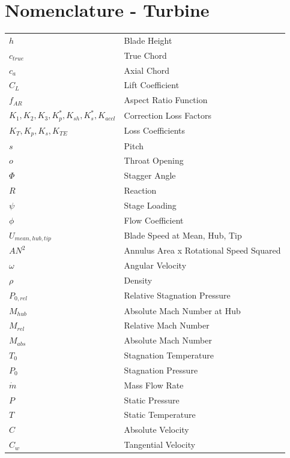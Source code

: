 \documentclass[12pt, letter]{report}
\begin{document}
\vspace{20pt}

\section*{Nomenclature - Turbine}

\begin{longtable*}{@{}l @{\quad  -  \quad} l@{}}

$h$ & Blade Height \\
$c_{true}$ & True Chord \\
$c_a$ & Axial Chord \\
$C_L$ & Lift Coefficient \\
$f_{AR}$ & Aspect Ratio Function \\
$K_1, K_2, K_3, K^*_p, K_{sh}, K^*_s, K_{accl}$ & Correction Loss Factors \\
$K_T, K_p, K_s, K_{TE}$ & Loss Coefficients \\
$s$ & Pitch \\
$o$ & Throat Opening \\
$\Phi$ & Stagger Angle \\
$R$ & Reaction \\
$\psi$ & Stage Loading \\
$\phi$ & Flow Coefficient \\
$U_{mean, hub, tip}$ & Blade Speed at Mean, Hub, Tip \\
$AN^2$ & Annulus Area x Rotational Speed Squared \\
$\omega$ & Angular Velocity \\
$\rho$ & Density  \\
$P_{0, rel}$ & Relative Stagnation Pressure \\
$M_{hub}$ & Absolute Mach Number at Hub  \\
$M_{rel}$ & Relative Mach Number \\
$M_{abs}$ & Absolute Mach Number \\
$T_0$ & Stagnation Temperature  \\
$P_0$ & Stagnation Pressure  \\
$\dot{m}$ & Mass Flow Rate  \\
$P$ & Static Pressure   \\
$T$ & Static Temperature  \\
$C$ & Absolute Velocity \\
$C_w$ & Tangential Velocity \\

\end{longtable*}
\end{document}

